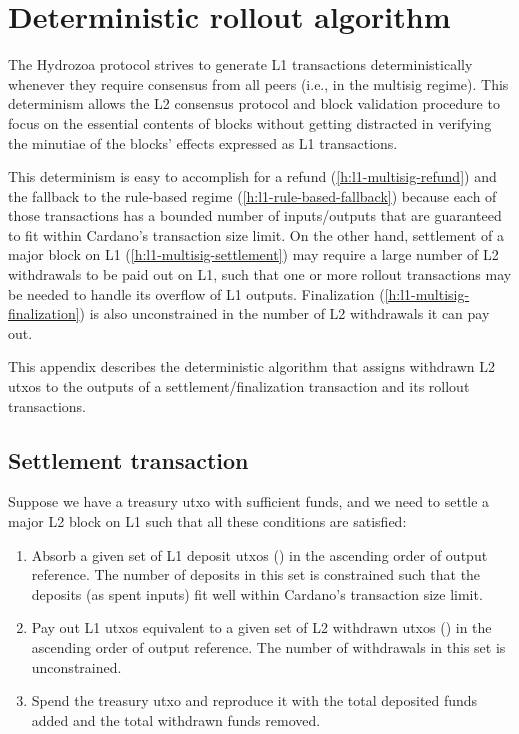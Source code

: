 \documentclass[../hydrozoa.tex]{subfiles}
\begin{document}
\chapter{Deterministic rollout algorithm}%
\label{h:deterministic-rollout-algorithm}%

The Hydrozoa protocol strives to generate L1 transactions deterministically whenever they require consensus from all peers (i.e., in the multisig regime).
This determinism allows the L2 consensus protocol and block validation procedure to focus on the essential contents of blocks without getting distracted in verifying the minutiae of the blocks' effects expressed as L1 transactions.

This determinism is easy to accomplish for a refund (\cref{h:l1-multisig-refund}) and the fallback to the rule-based regime (\cref{h:l1-rule-based-fallback}) because each of those transactions has a bounded number of inputs/outputs that are guaranteed to fit within Cardano's transaction size limit.
On the other hand, settlement of a major block on L1 (\cref{h:l1-multisig-settlement}) may require a large number of L2 withdrawals to be paid out on L1, such that one or more rollout transactions may be needed to handle its overflow of L1 outputs.
Finalization (\cref{h:l1-multisig-finalization}) is also unconstrained in the number of L2 withdrawals it can pay out.

This appendix describes the deterministic algorithm that assigns withdrawn L2 utxos to the outputs of a settlement/finalization transaction and its rollout transactions.

\section{Settlement transaction}%
\label{h:deterministic-rollout-settlement}%

Suppose we have a treasury utxo with sufficient funds, and we need to settle a major L2 block on L1 such that all these conditions are satisfied:
\begin{enumerate}
  \item Absorb a given set of L1 deposit utxos () in the ascending order of output reference.
    The number of deposits in this set is constrained such that the deposits (as spent inputs) fit well within Cardano's transaction size limit.
  \item Pay out L1 utxos equivalent to a given set of L2 withdrawn utxos () in the ascending order of output reference.
    The number of withdrawals in this set is unconstrained.
  \item Spend the treasury utxo and reproduce it with the total deposited funds added and the total withdrawn funds removed.
\end{enumerate}
\end{document}
